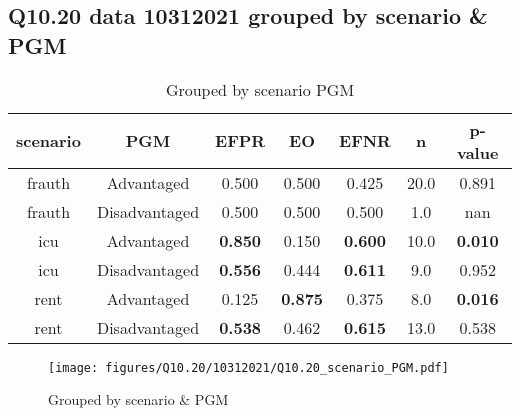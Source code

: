 \subsection{Q10.20 data 10312021 grouped by scenario \& PGM}

\begin{comment}
                             EFPR        EO      EFNR     n    pvalue
(frauth, Advantaged)     0.500000  0.500000  0.425000  20.0  0.890746
(frauth, Disadvantaged)  0.500000  0.500000  0.500000   1.0       NaN
(icu, Advantaged)        0.850000  0.150000  0.600000  10.0  0.010220
(icu, Disadvantaged)     0.555556  0.444444  0.611111   9.0  0.951739
(rent, Advantaged)       0.125000  0.875000  0.375000   8.0  0.016377
(rent, Disadvantaged)    0.538462  0.461538  0.615385  13.0  0.537596
\end{comment}

\begin{table}[h]
    \centering
    \begin{tabular}{|c|c|c|c|c|c|c|}
        \hline
        scenario & PGM & EFPR & EO & EFNR & n & p-value\\
        \hline
        frauth & Advantaged & 0.500 & 0.500 & 0.425 & 20.0 & 0.891\\
		frauth & Disadvantaged & 0.500 & 0.500 & 0.500 & 1.0 & nan\\
		icu & Advantaged & \textbf{0.850} & 0.150 & \textbf{0.600} & 10.0 & \textbf{0.010}\\
		icu & Disadvantaged & \textbf{0.556} & 0.444 & \textbf{0.611} & 9.0 & 0.952\\
		rent & Advantaged & 0.125 & \textbf{0.875} & 0.375 & 8.0 & \textbf{0.016}\\
		rent & Disadvantaged & \textbf{0.538} & 0.462 & \textbf{0.615} & 13.0 & 0.538\\
		
        \hline
    \end{tabular}
    \caption{Grouped by scenario PGM}
    \label{tab:my_label}
\end{table}
\begin{figure}[h]
    \centering
    \texttt{[image: figures/Q10.20/10312021/Q10.20\_scenario\_PGM.pdf]}
    \caption{Grouped by scenario \& PGM}
    \label{fig:my_label}
\end{figure}
